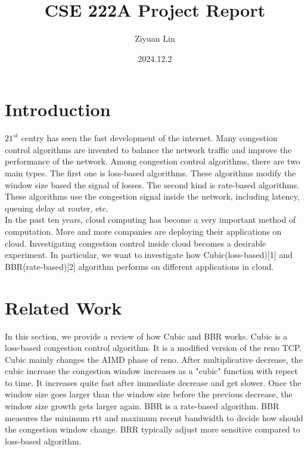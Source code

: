 \documentclass{article}
\title{CSE 222A Project Report}
\author{Ziyuan Lin}
\date{2024.12.2}
\begin{document}
\maketitle

\section{Introduction}
$21^{st}$ centry has seen the fast development of the internet. Many congestion control algorithms are invented to balance the network traffic and improve the performance of the network.
Among congestion control algorithms, there are two main types. The first one is loss-based algorithms. These algorithms modify the window size based the signal of losses. The second kind is 
rate-based algorithms. These algorithms use the congestion signal inside the network, including latency, queuing delay at router, etc.
\\[6pt]
In the past ten years, cloud computing has become a very important method of computation. More and more companies are deploying their applications on cloud. Investigating congestion control
inside cloud becomes a desirable experiment. In particular, we want to investigate how Cubic(loss-based)[1] and BBR(rate-based)[2] algorithm performs on different applications in cloud. 

\section{Related Work}
In this section, we provide a review of how Cubic and BBR works. Cubic is a loss-based congestion control algorithm. It is a modified version of the reno TCP. Cubic mainly changes the AIMD phase
of reno. After multiplicative decrease, the cubic increase the congestion window increases as a "cubic" function with repect to time. It increases quite fast after immediate decrease and get slower.
Once the window size goes larger than the window size before the previous decrease, the window size growth gets larger again. BBR is a rate-based algorithm. BBR measures the minimum rtt and maximum
recent bandwidth to decide how should the congestion window change. BRR typically adjust more sensitive compared to loss-based algorithm.
\end{document}
